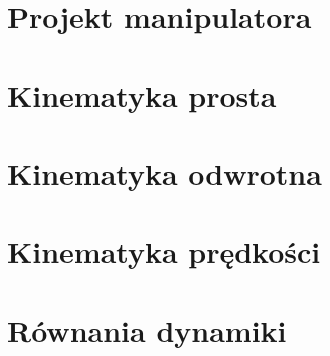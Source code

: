 \section{Projekt manipulatora} 

\section{Kinematyka prosta} 

\section{Kinematyka odwrotna} 

\section{Kinematyka prędkości} 
\newpage
\section{Równania dynamiki} 